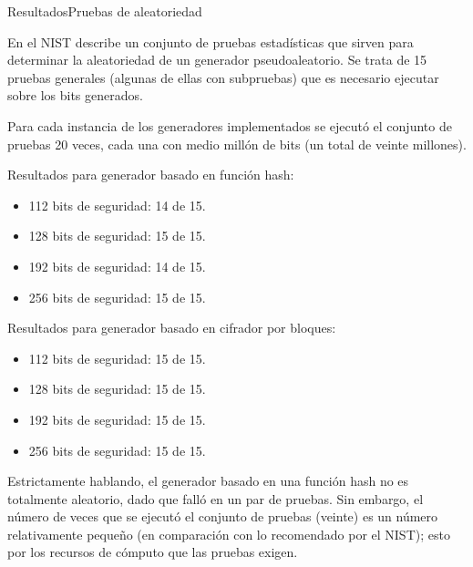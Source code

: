 \begin{frame}{Resultados}{Pruebas de aleatoriedad}

  En \cite{nist_pruebas} el NIST describe un conjunto de pruebas estadísticas
  que sirven para determinar la aleatoriedad de un generador pseudoaleatorio.
  Se trata de 15 pruebas generales (algunas de ellas con subpruebas) que es
  necesario ejecutar sobre los bits generados.

  Para cada instancia de los generadores implementados se ejecutó el conjunto
  de pruebas 20 veces, cada una con medio millón de bits (un total de veinte
  millones).

  {
    Resultados para generador basado en función hash:
    \begin{itemize}
      \item 112 bits de seguridad: 14 de 15.
      \item 128 bits de seguridad: 15 de 15.
      \item 192 bits de seguridad: 14 de 15.
      \item 256 bits de seguridad: 15 de 15.
    \end{itemize}
  }

  {
    Resultados para generador basado en cifrador por bloques:
    \begin{itemize}
      \item 112 bits de seguridad: 15 de 15.
      \item 128 bits de seguridad: 15 de 15.
      \item 192 bits de seguridad: 15 de 15.
      \item 256 bits de seguridad: 15 de 15.
    \end{itemize}
  }

  \note
  {
    Estrictamente hablando, el generador basado en una función hash no es
    totalmente aleatorio, dado que falló en un par de pruebas. Sin embargo,
    el número de veces que se ejecutó el conjunto de pruebas (veinte) es
    un número relativamente pequeño (en comparación con lo recomendado por
    el NIST); esto por los recursos de cómputo que las pruebas exigen.
  }

\end{frame}
